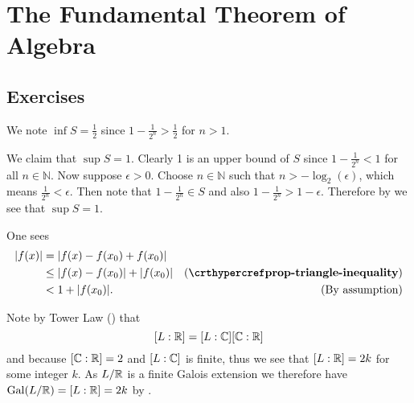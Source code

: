 \section{The Fundamental Theorem of Algebra}
\subsection*{Exercises}
\begin{questions}
    \item We note $\inf S = \frac12$ since $1 - \frac1{2^n} >
    \frac12$ for $n > 1$.

    We claim that $\sup S = 1$. Clearly 1 is an upper bound of $S$ since $1 - \frac1{2^n} < 1$ for all $n \in \mathbb{N}$. Now suppose $\epsilon > 0$. Choose $n \in \mathbb{N}$ such that $n > -\log_2(\epsilon)$, which means $\frac1{2^n} < \epsilon$. Then note that $1 - \frac1{2^n} \in S$ and also $1 - \frac1{2^n} > 1 - \epsilon$. Therefore by  we see that $\sup S = 1$.

    \item One sees
    \begin{align*}
        |f(x)| &= |f(x) - f(x_0) + f(x_0)|\\
        &\leq |f(x) - f(x_0)| + |f(x_0)| & (\myref{prop-triangle-inequality})\\
        &< 1 + |f(x_0)|. & (\text{By assumption})
    \end{align*}

    \item Note by Tower Law () that
    \[
        [L:\mathbb{R}] = [L:\mathbb{C}][\mathbb{C}:\mathbb{R}]
    \]
    and because $[\mathbb{C}:\mathbb{R}] = 2$ and $[L:\mathbb{C}]$ is finite, thus we see that $[L:\mathbb{R}] = 2k$ for some integer $k$. As $L/\mathbb{R}$ is a finite Galois extension we therefore have $\mathrm{Gal}(L/\mathbb{R}) = [L:\mathbb{R}] = 2k$ by .


\end{questions}
